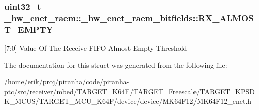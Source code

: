 \subsubsection[{\texorpdfstring{R\+X\+\_\+\+A\+L\+M\+O\+S\+T\+\_\+\+E\+M\+P\+TY}{RX_ALMOST_EMPTY}}]{\setlength{\rightskip}{0pt plus 5cm}uint32\+\_\+t \+\_\+hw\+\_\+enet\+\_\+raem\+::\+\_\+hw\+\_\+enet\+\_\+raem\+\_\+bitfields\+::\+R\+X\+\_\+\+A\+L\+M\+O\+S\+T\+\_\+\+E\+M\+P\+TY}\hypertarget{struct__hw__enet__raem_1_1__hw__enet__raem__bitfields_a224c85f688141303a6f43b333d1b3188}{}\label{struct__hw__enet__raem_1_1__hw__enet__raem__bitfields_a224c85f688141303a6f43b333d1b3188}
\mbox{[}7\+:0\mbox{]} Value Of The Receive F\+I\+FO Almost Empty Threshold 

The documentation for this struct was generated from the following file\+:\begin{DoxyCompactItemize}
\item 
/home/erik/proj/piranha/code/piranha-\/ptc/src/receiver/mbed/\+T\+A\+R\+G\+E\+T\+\_\+\+K64\+F/\+T\+A\+R\+G\+E\+T\+\_\+\+Freescale/\+T\+A\+R\+G\+E\+T\+\_\+\+K\+P\+S\+D\+K\+\_\+\+M\+C\+U\+S/\+T\+A\+R\+G\+E\+T\+\_\+\+M\+C\+U\+\_\+\+K64\+F/device/device/\+M\+K64\+F12/M\+K64\+F12\+\_\+enet.\+h\end{DoxyCompactItemize}
